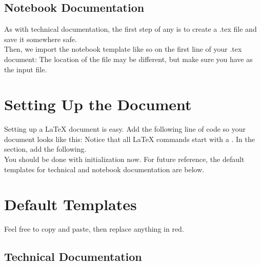 \subsection{Notebook Documentation}
As with technical documentation, the first step of any is to create a .tex file and save it somewhere safe.\\
Then, we import the notebook template like so on the first line of your .tex document:  The location of the file may be different, but make sure you have  as the input file.

\section{Setting Up the Document}
Setting up a \LaTeX{} document is easy.  Add the following line of code so your document looks like this:   Notice that all \LaTeX{} commands start with a \code{\sla}.\newpage
In the  section, add the following.
\\
You should be done with initialization now.  For future reference, the default templates for technical and notebook documentation are below.

\section{Default Templates}
Feel free to copy and paste, then replace anything in red.
\subsection{Technical Documentation}
